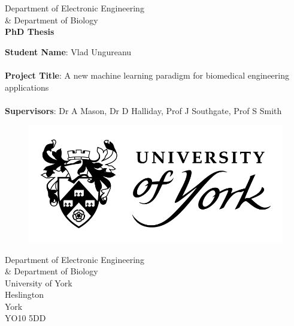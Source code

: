 \begin{titlepage} 
  \begin{center} 
    
    	\large Department of Electronic Engineering \\ \& Department of Biology \\
        \vspace{1.5cm}
		\Huge \textbf{PhD Thesis} \\
        \vspace{2.0cm}
            
       \begin{flushleft}
        \large \textbf{Student Name}: Vlad Ungureanu \\~\\
        \large \textbf{Project Title}: A new machine learning paradigm for
        biomedical engineering applications\\~\\
        \large \textbf{Supervisors}: Dr A Mason, Dr D Halliday, Prof J Southgate, Prof S Smith
 
       \end{flushleft} 
            
           \begin{figure}[t]
          	\includegraphics[width=\linewidth]{Images/Resources/UOY_logo}
          \end{figure}

    \vspace{2.6cm}
    \small Department of Electronic Engineering \\ \& Department of Biology \\
    \small University of York \\
    \small Heslington \\
    \small York \\
    \small YO10 5DD\\
                  
 \end{center} 
    
\end{titlepage}
